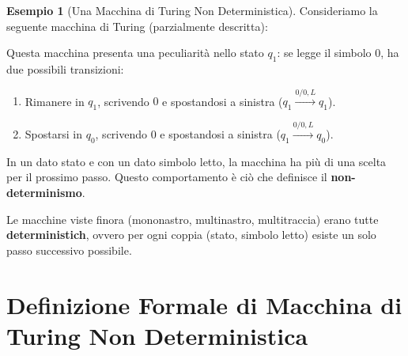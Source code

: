 \documentclass[a4paper]{article}
\theoremstyle{definition} %
\newtheorem{example}{Esempio}
\newcommand{\blankS}{\ensuremath{\raisebox{-0.15ex}{\scalebox{1.3}[0.7]{$\sqcup$}}\mkern2mu}}
\begin{document}
\begin{example}[Una Macchina di Turing Non Deterministica]
Consideriamo la seguente macchina di Turing (parzialmente descritta):
\begin{center}
\end{center}
Questa macchina presenta una peculiarità nello stato $q_1$: se legge il simbolo $0$, ha due possibili transizioni:
\begin{enumerate}
    \item Rimanere in $q_1$, scrivendo $0$ e spostandosi a sinistra ($q_1 \xrightarrow{0/0, L} q_1$).
    \item Spostarsi in $q_0$, scrivendo $0$ e spostandosi a sinistra ($q_1 \xrightarrow{0/0, L} q_0$).
\end{enumerate}
In un dato stato e con un dato simbolo letto, la macchina ha più di una scelta per il prossimo passo. Questo comportamento è ciò che definisce il \textbf{non-determinismo}.
\end{example}

Le macchine viste finora (mononastro, multinastro, multitraccia) erano tutte \textbf{deterministich}, ovvero per ogni coppia (stato, simbolo letto) esiste un solo passo successivo possibile.

\section{Definizione Formale di Macchina di Turing Non Deterministica}
\end{document}
